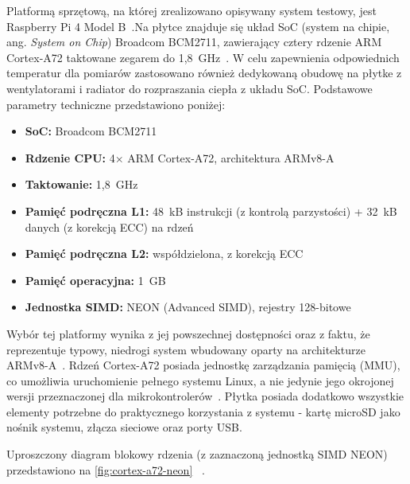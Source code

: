 Platformą sprzętową, na której zrealizowano opisywany system testowy, jest
Raspberry Pi 4 Model B~\cite{RaspberryPi4Product}.Na płytce znajduje się układ SoC (system na chipie, ang. \textit{System on Chip}) Broadcom BCM2711,
zawierający cztery rdzenie ARM Cortex-A72 taktowane zegarem do 1,8~GHz~\cite{RaspberryPi4Product}. W celu zapewnienia odpowiednich temperatur dla pomiarów zastosowano również 
dedykowaną obudowę na płytke z wentylatorami i radiator do rozpraszania ciepła z układu SoC.
Podstawowe parametry techniczne przedstawiono poniżej:
\begin{itemize}
    \item \textbf{SoC:} Broadcom BCM2711~\cite{RaspberryPi4Product}
    \item \textbf{Rdzenie CPU:} 4× ARM Cortex-A72, architektura ARMv8-A~\cite{ArmCortexA72TRM}
    \item \textbf{Taktowanie:} 1,8~GHz~\cite{RaspberryPi4Product}
    \item \textbf{Pamięć podręczna L1:} 48~kB instrukcji (z kontrolą parzystości) + 32~kB danych (z korekcją ECC) na rdzeń~\cite{ArmCortexA72TRM}
    \item \textbf{Pamięć podręczna L2:} współdzielona, z korekcją ECC~\cite{ArmCortexA72TRM}
    \item \textbf{Pamięć operacyjna:} 1~GB ~\cite{RaspberryPi4Product}
    \item \textbf{Jednostka SIMD:} NEON (Advanced SIMD), rejestry 128-bitowe~\cite{ArmNeonGuide}
\end{itemize}

Wybór tej platformy wynika z jej powszechnej dostępności oraz z faktu, że
reprezentuje typowy, niedrogi system wbudowany oparty na architekturze
ARMv8-A~\cite{RaspberryPi4Product}. Rdzeń Cortex-A72 posiada 
jednostkę zarządzania pamięcią (MMU), co umożliwia uruchomienie pełnego
systemu Linux, a nie jedynie jego okrojonej wersji przeznaczonej dla
mikrokontrolerów~\cite{ArmCortexA72TRM}. Płytka posiada dodatkowo wszystkie
elementy potrzebne do praktycznego korzystania z systemu - kartę microSD
jako nośnik systemu, złącza sieciowe oraz porty USB.

Uproszczony diagram blokowy rdzenia (z zaznaczoną jednostką SIMD NEON) przedstawiono na \cref{fig:cortex-a72-neon} ~\cite{ArmCortexA72TRM}.

